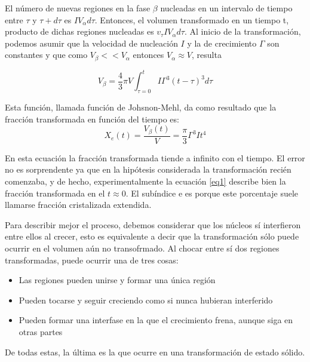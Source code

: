 \documentclass[12pt]{article}
\theoremstyle{definition}
\theoremstyle{remark}
\begin{document}
El número de nuevas regiones en la fase $\beta$ nucleadas en un intervalo de tiempo entre $\tau$ y $\tau + d\tau$ es $IV_\alpha d\tau$. Entonces, el volumen transformado en un tiempo t, producto de dichas regiones nucleadas es $v_\tau IV_\alpha d\tau$. Al inicio de la transformación, podemos asumir que la velocidad de nucleación $I$ y la de crecimiento $\Gamma$ son constantes y que como $V_\beta << V_\alpha$ entonces $V_\alpha \approx V$, resulta

\begin{equation}
\label{integral}
	V_\beta = \frac{4}{3}\pi V \int_{\tau = 0}^{t} I\Gamma^3(t-\tau)^3d\tau
\end{equation}

Esta función, llamada función de Johsnon-Mehl, da como resultado que la fracción transformada en función del tiempo es:
\begin{equation}
\label{eq1}
	X_e(t) = \frac{V_\beta (t)}{V} = \frac{\pi}{3}\Gamma^3 I t^4
\end{equation}

En esta ecuación la fracción transformada tiende a infinito con el tiempo. El error no es sorprendente ya que en la hipótesis considerada la transformación recién comenzaba, y de hecho, experimentalmente la ecuación \ref{eq1} describe bien la fracción transformada en el $t \approx 0$. El subíndice e es porque este porcentaje suele llamarse fracción cristalizada extendida.

Para describir mejor el proceso, debemos considerar que los núcleos sí interfieron entre ellos al crecer, esto es equivalente a decir que la transformación sólo puede ocurrir en el volumen aún no transofrmado. Al chocar entre sí dos regiones transformadas, puede ocurrir una de tres cosas:
\begin{itemize}
\item Las regiones pueden unirse y formar una única región
\item Pueden tocarse y seguir creciendo como si nunca hubieran interferido
\item Pueden formar una interfase en la que el crecimiento frena, aunque siga en otras partes
\end{itemize}

De todas estas, la última es la que ocurre en una transformación de estado sólido.
\end{document}
